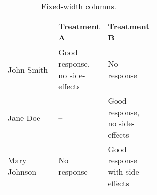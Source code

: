 \documentclass[a4paper, 12pt]{article}
\begin{document}
\begin{center}
		\clearpage
		
		\begin{table}[ht]
			\renewcommand\arraystretch{1.5}
			\centering
			\caption{Fixed-width columns.}
			\begin{tabular}[t]{l>{\raggedright}p{0.3\linewidth}>{\raggedright\arraybackslash}p{0.3\linewidth}}
				\hline
				&Treatment A&Treatment B\\
				\hline
				John Smith&Good response, no side-effects&No response\\
				Jane Doe&--&Good response, no side-effects\\
				Mary Johnson&No response&Good response with side-effects\\
				\hline
			\end{tabular}
		\end{table}%
			
	\end{center}

	
\end{document}
